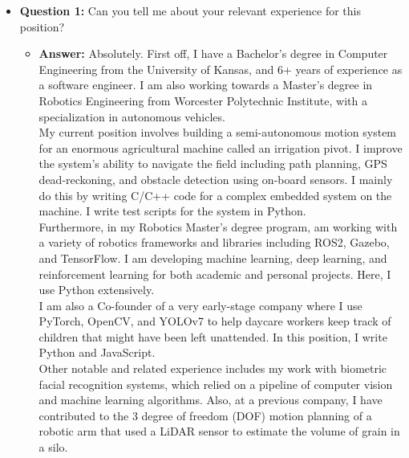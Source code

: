 \documentclass{article}
\begin{document}
\begin{itemize}
    \item \textbf{Question 1:} Can you tell me about your relevant experience for this position?
    \begin{itemize}
        \item \textbf{Answer:} Absolutely. First off, I have a Bachelor's degree in 
        Computer Engineering from the University of Kansas, and 
        6+ years of experience as a software engineer. I am also
        working towards a Master's degree in Robotics Engineering
        from Worcester Polytechnic Institute, with a specialization
        in autonomous vehicles.\\

        My current position involves building a semi-autonomous motion system
        for an enormous agricultural machine called an irrigation pivot.
        I improve the system's ability to navigate the field including
        path planning, GPS dead-reckoning, and obstacle detection using
        on-board sensors. I mainly
        do this by writing C/C++ code for a complex embedded system on the machine.
        I write test scripts for the system in Python.\\

        Furthermore, in my Robotics Master's degree program, am working with
        a variety of robotics frameworks
        and libraries including ROS2, Gazebo, and TensorFlow. I am developing
        machine learning, deep learning, and reinforcement learning
        for both academic and personal projects. Here, I use Python extensively.\\

        I am also a Co-founder of a very early-stage company where I use
        PyTorch, OpenCV, and YOLOv7 to help daycare workers keep track of
        children that might have been left unattended. In this position,
        I write Python and JavaScript.\\

        Other notable and related experience includes my work with biometric
        facial recognition systems, which relied on a pipeline of computer
        vision and machine learning algorithms. Also, at a previous company,
        I have contributed to the 3 degree of freedom (DOF) motion planning
        of a robotic arm that used a LiDAR sensor to estimate the volume
        of grain in a silo.\\
    \end{itemize}
    

\end{itemize}
\end{document}

